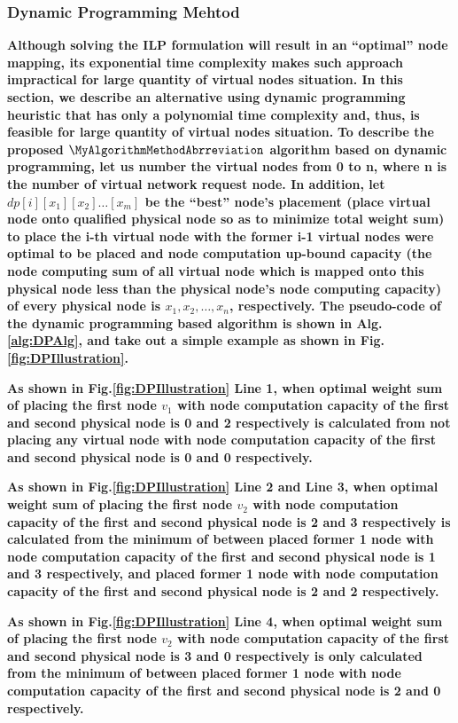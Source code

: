 \subsubsection{Dynamic Programming Mehtod}
\label{lab:DynamicProgrammingEquation}

\textbf{
Although solving the ILP formulation will result in an “optimal” node mapping, its exponential time complexity makes such approach impractical for large quantity of virtual nodes situation. In this section, we describe an alternative using dynamic programming heuristic that has only a polynomial time complexity and, thus, is feasible for large quantity of virtual nodes situation.
}
\textbf{
To describe the proposed $\MyAlgorithmMethodAbrreviation$ algorithm based on dynamic programming, let us number the virtual nodes from 0 to n, where n is the number of virtual network request node. In addition, let $dp[i][{x_1}][{x_2}] \ldots [{x_m}]$ be the “best” node's placement (place virtual node onto qualified physical node so as to minimize total weight sum) to place the i-th virtual node with the former i-1 virtual nodes were optimal to be placed and node computation up-bound capacity (the node computing sum of all virtual node which is mapped onto this physical node less than the physical node's node computing capacity) of every physical node is $x_1,x_2,\ldots,x_n$, respectively.  The pseudo-code of the dynamic programming based algorithm is shown in Alg.\ref{alg:DPAlg}, and take out a simple example as shown in Fig.\ref{fig:DPIllustration}.
}



\textbf{
As shown in Fig.\ref{fig:DPIllustration} Line 1, when optimal weight sum of placing the first node $v_1$ with node computation capacity of the first and second physical node is 0 and 2 respectively is calculated from not placing any virtual node with node computation capacity of the first and second physical node is 0 and 0 respectively.
}

\textbf{
As shown in Fig.\ref{fig:DPIllustration} Line 2 and Line 3, when optimal weight sum of placing the first node $v_2$ with node computation capacity of the first and second physical node is 2 and 3 respectively is calculated   from the minimum of between placed former 1 node with node computation capacity of the first and second physical node is 1 and 3 respectively, and placed former 1 node with node computation capacity of the first and second physical node is 2 and 2 respectively.
}

\textbf{
As shown in Fig.\ref{fig:DPIllustration} Line 4, when optimal weight sum of placing the first node $v_2$ with node computation capacity of the first and second physical node is 3 and 0 respectively is only calculated   from the minimum of between placed former 1 node with node computation capacity of the first and second physical node is 2 and 0 respectively.
}

